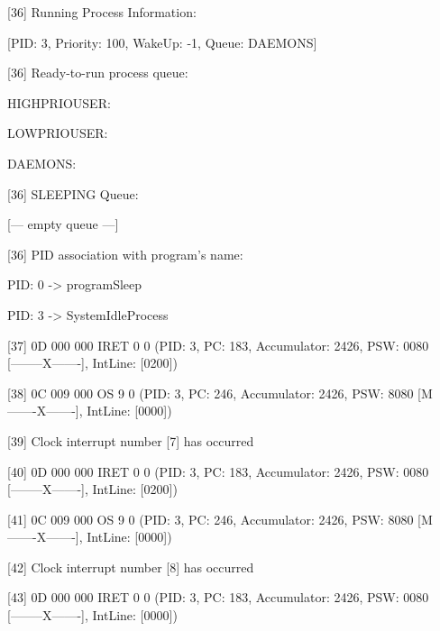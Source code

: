 	[\textcolor{termred}{36}] Running Process Information:

		[PID: \textcolor{termgreen}{3}, Priority: 100, WakeUp: \textcolor{termred}{-1}, Queue: DAEMONS]

	[\textcolor{termred}{36}] Ready-to-run process queue:

 		HIGHPRIOUSER: 

		LOWPRIOUSER: 

		DAEMONS: 

	[\textcolor{termred}{36}] SLEEPING Queue:

		[--- empty queue ---]

	[\textcolor{termred}{36}] PID association with program's name:

		PID: \textcolor{termgreen}{0} -> programSleep

		PID: \textcolor{termgreen}{3} -> SystemIdleProcess

[\textcolor{termred}{37}] {0D 000 000} IRET 0 0 (PID: \textcolor{termgreen}{3}, PC: \textcolor{termred}{183}, Accumulator: \textcolor{termred}{2426}, PSW: \textcolor{termred}{0080} [\textcolor{termred}{--------X-------}], IntLine: [\textcolor{termred}{0200}])

[\textcolor{termred}{38}] {0C 009 000} OS 9 0 (PID: \textcolor{termgreen}{3}, PC: \textcolor{termred}{246}, Accumulator: \textcolor{termred}{2426}, PSW: \textcolor{termred}{8080} [\textcolor{termred}{M-------X-------}], IntLine: [\textcolor{termred}{0000}])

	[\textcolor{termred}{39}] \textcolor{termcyan}{Clock interrupt number [7] has occurred}

[\textcolor{termred}{40}] {0D 000 000} IRET 0 0 (PID: \textcolor{termgreen}{3}, PC: \textcolor{termred}{183}, Accumulator: \textcolor{termred}{2426}, PSW: \textcolor{termred}{0080} [\textcolor{termred}{--------X-------}], IntLine: [\textcolor{termred}{0200}])

[\textcolor{termred}{41}] {0C 009 000} OS 9 0 (PID: \textcolor{termgreen}{3}, PC: \textcolor{termred}{246}, Accumulator: \textcolor{termred}{2426}, PSW: \textcolor{termred}{8080} [\textcolor{termred}{M-------X-------}], IntLine: [\textcolor{termred}{0000}])

	[\textcolor{termred}{42}] \textcolor{termcyan}{Clock interrupt number [8] has occurred}

[\textcolor{termred}{43}] {0D 000 000} IRET 0 0 (PID: \textcolor{termgreen}{3}, PC: \textcolor{termred}{183}, Accumulator: \textcolor{termred}{2426}, PSW: \textcolor{termred}{0080} [\textcolor{termred}{--------X-------}], IntLine: [\textcolor{termred}{0000}])

